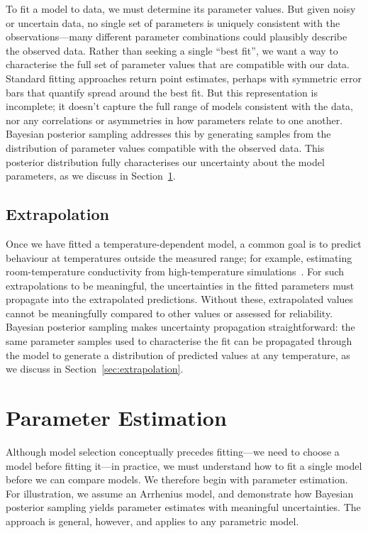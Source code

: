 \documentclass[reprint,superscriptaddress,nobibnotes,nofootinbib,amsmath,amssymb,aps,hidelinks]{revtex4-2}
\begin{document}
To fit a model to data, we must determine its parameter values. 
But given noisy or uncertain data, no single set of parameters is uniquely consistent with the observations---many different parameter combinations could plausibly describe the observed data. 
Rather than seeking a single ``best fit'', we want a way to characterise the full set of parameter values that are compatible with our data.
Standard fitting approaches return point estimates, perhaps with symmetric error bars that quantify spread around the best fit. 
But this representation is incomplete; it doesn't capture the full range of models consistent with the data, nor any correlations or asymmetries in how parameters relate to one another.
Bayesian posterior sampling addresses this by generating samples from the distribution of parameter values compatible with the observed data. 
This posterior distribution fully characterises our uncertainty about the model parameters, as we discuss in Section~\ref{sec:parameter_estimation}.

\subsection{Extrapolation}

Once we have fitted a temperature-dependent model, a common goal is to predict behaviour at temperatures outside the measured range; for example, estimating room-temperature conductivity from high-temperature simulations~\cite{Goldmann2025}. 
For such extrapolations to be meaningful, the uncertainties in the fitted parameters must propagate into the extrapolated predictions. 
Without these, extrapolated values cannot be meaningfully compared to other values or assessed for reliability.
Bayesian posterior sampling makes uncertainty propagation straightforward: the same parameter samples used to characterise the fit can be propagated through the model to generate a distribution of predicted values at any temperature, as we discuss in Section~\ref{sec:extrapolation}.

\section{Parameter Estimation}
\label{sec:parameter_estimation}

Although model selection conceptually precedes fitting---we need to choose a model before fitting it---in practice, we must understand how to fit a single model before we can compare models.
We therefore begin with parameter estimation.
For illustration, we assume an Arrhenius model, and demonstrate how Bayesian posterior sampling yields parameter estimates with meaningful uncertainties.
The approach is general, however, and applies to any parametric model.
\end{document}
